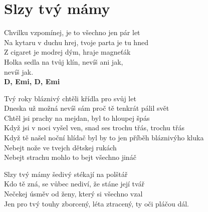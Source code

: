 \section{Slzy tvý mámy}
\onehalfspacing

Chvilku vzpomínej, je to všechno jen pár let\\
Na kytaru v duchu hrej, tvoje parta je tu hned\\
Z cigaret je modrej dým, hraje magneťák\\
Holka sedla na tvůj klín, nevíš ani jak,\\
nevíš jak.\\
\textbf{D, Emi, D, Emi}\\

\sloka{}

Tvý roky bláznivý chtěli křídla pro svůj let \\
Dneska už možná nevíš sám proč tě tenkrát pálil svět \\
Chtěl jsi prachy na mejdan, byl to hloupej špás\\
Když jsi v noci vyšel ven, snad ses trochu třás, trochu třás\\

Když tě našel noční hlídač byl by to jen příběh bláznivýho kluka\\
Nebejt nože ve tvejch dětskej rukách \\
Nebejt strachu mohlo to bejt všechno jináč\\


Slzy tvý mámy šedivý stékají na polštář\\
Kdo tě zná, se vůbec nediví, že stáne její tvář\\
Nečekej úsměv od ženy, který si všechno vzal\\
Jen pro tvý touhy zborcený, léta ztracený, ty oči pláčou dál.\\

